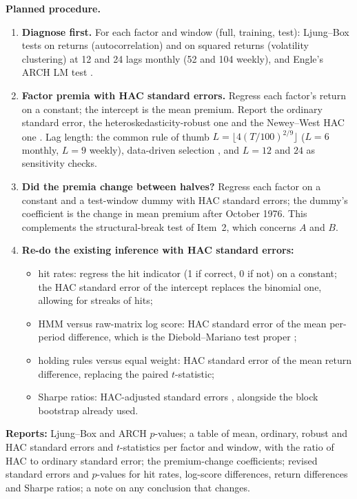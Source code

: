 \documentclass[11pt]{article}
\begin{document}
\textbf{Planned procedure.}
\begin{enumerate}
\item \textbf{Diagnose first.} For each factor and window (full, training, test): Ljung--Box tests \citep{ljung1978} on returns (autocorrelation) and on squared returns (volatility clustering) at 12 and 24 lags monthly (52 and 104 weekly), and Engle's ARCH LM test \citep{engle1982}.
\item \textbf{Factor premia with HAC standard errors.} Regress each factor's return on a constant; the intercept is the mean premium. Report the ordinary standard error, the heteroskedasticity-robust one \citep{white1980} and the Newey--West HAC one \citep{newey1987}. Lag length: the common rule of thumb $L=\lfloor 4(T/100)^{2/9}\rfloor$ ($L=6$ monthly, $L=9$ weekly), data-driven selection \citep{andrews1991,newey1994}, and $L=12$ and $24$ as sensitivity checks.
\item \textbf{Did the premia change between halves?} Regress each factor on a constant and a test-window dummy with HAC standard errors; the dummy's coefficient is the change in mean premium after October 1976. This complements the structural-break test of Item~2, which concerns $A$ and $B$.
\item \textbf{Re-do the existing inference with HAC standard errors:}
\begin{itemize}
\item hit rates: regress the hit indicator (1 if correct, 0 if not) on a constant; the HAC standard error of the intercept replaces the binomial one, allowing for streaks of hits;
\item HMM versus raw-matrix log score: HAC standard error of the mean per-period difference, which is the Diebold--Mariano test proper \citep{diebold1995};
\item holding rules versus equal weight: HAC standard error of the mean return difference, replacing the paired $t$-statistic;
\item Sharpe ratios: HAC-adjusted standard errors \citep{lo2002}, alongside the block bootstrap already used.
\end{itemize}
\end{enumerate}
\textbf{Reports:} Ljung--Box and ARCH $p$-values; a table of mean, ordinary, robust and HAC standard errors and $t$-statistics per factor and window, with the ratio of HAC to ordinary standard error; the premium-change coefficients; revised standard errors and $p$-values for hit rates, log-score differences, return differences and Sharpe ratios; a note on any conclusion that changes.
\end{document}
